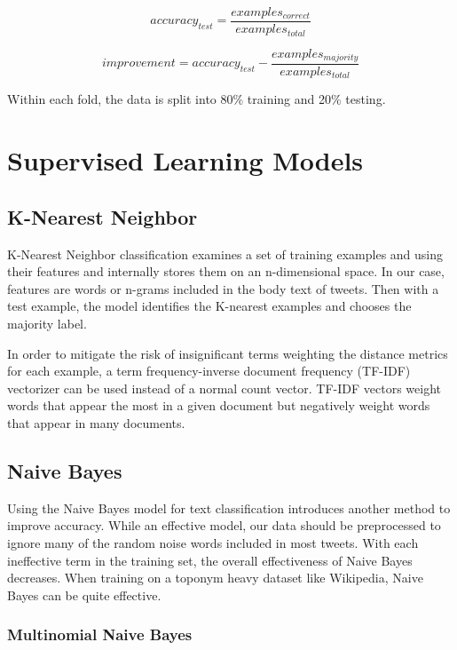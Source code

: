 \documentclass[midd]{thesis}
\begin{document}
\begin{equation}
\label{eqn:accuracy}
accuracy_{test}=\frac{examples_{correct}}{examples_{total}}
\end{equation}

\begin{equation}
\label{eqn:improvement}
improvement=accuracy_{test} - \frac{examples_{majority}}{examples_{total}}
\end{equation}

Within each fold, the data is split into 80\% training and 20\% testing.

\section{Supervised Learning Models}
\subsection{K-Nearest Neighbor}

K-Nearest Neighbor classification examines a set of training examples and using their features and internally stores them on an n-dimensional space. In our case, features are words or n-grams included in the body text of tweets. Then with a test example, the model identifies the K-nearest examples and chooses the majority label.

In order to mitigate the risk of insignificant terms weighting the distance metrics for each example, a term frequency-inverse document frequency (TF-IDF) vectorizer can be used instead of a  normal count vector. TF-IDF vectors weight words that appear the most in a given document but negatively weight words that appear in many documents.


\subsection{Naive Bayes}

Using the Naive Bayes model for text classification introduces another method to improve accuracy. While an effective model, our data should be preprocessed to ignore many of the random noise words included in most tweets. With each ineffective term in the training set, the overall effectiveness of Naive Bayes decreases. When training on a toponym heavy dataset like Wikipedia, Naive Bayes can be quite effective.

\subsubsection{Multinomial Naive Bayes}
\end{document}
